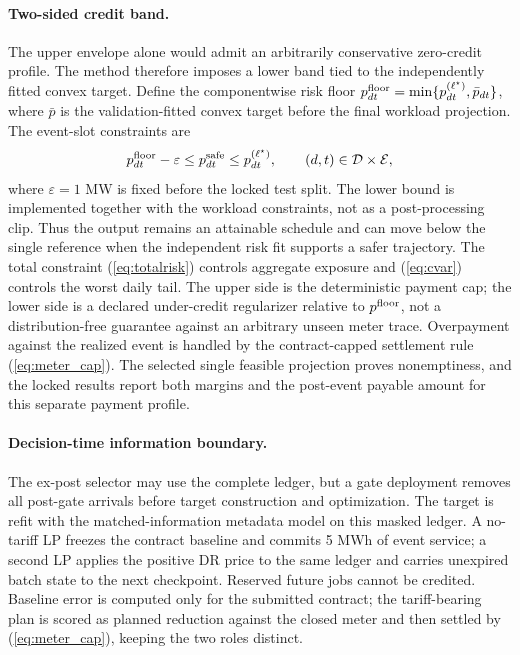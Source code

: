 \documentclass[10pt,journal]{IEEEtran}
\begin{document}
\paragraph{Two-sided credit band.}
The upper envelope alone would admit an arbitrarily conservative zero-credit
profile. The method therefore imposes a lower band tied to the independently fitted
convex target. Define the componentwise risk floor
\(p^{\rm floor}_{dt}=\min\{p^{(\ell^\star)}_{dt},\bar p_{dt}\}\), where \(\bar p\)
is the validation-fitted convex target before the final workload projection.
The event-slot constraints are
\begin{equation}
 p^{\rm floor}_{dt}-\varepsilon
 \leq p^{\rm safe}_{dt}\leq p^{(\ell^\star)}_{dt},
 \qquad (d,t)\in\mathcal D\times\mathcal E,
 \label{eq:twosided}
\end{equation}
where $\varepsilon=1$ MW is fixed before the locked test split. The lower
bound is implemented together with the workload constraints, not as a
post-processing clip. Thus the output remains an attainable schedule and can
move below the single reference when the independent risk fit supports a safer
trajectory. The total constraint (\ref{eq:totalrisk}) controls aggregate
exposure and (\ref{eq:cvar}) controls the worst daily tail. The upper side is
the deterministic payment cap; the lower side is a declared under-credit
regularizer relative to $p^{\rm floor}$, not a distribution-free guarantee
against an arbitrary unseen meter trace. Overpayment against the realized
event is handled by the contract-capped settlement rule (\ref{eq:meter_cap}). The selected
single feasible projection proves nonemptiness, and the locked results report
both margins and the post-event payable amount for this separate payment
profile.

\paragraph{Decision-time information boundary.}
The ex-post selector may use the complete ledger, but a gate deployment removes
all post-gate arrivals before target construction and optimization. The target
is refit with the matched-information metadata model on this masked ledger. A
no-tariff LP freezes the contract baseline and commits 5 MWh of event service;
a second LP applies the positive DR price to the same ledger and carries
unexpired batch state to the next checkpoint. Reserved future jobs cannot be
credited. Baseline error is computed only for the submitted contract; the
tariff-bearing plan is scored as planned reduction against the closed meter and
then settled by (\ref{eq:meter_cap}), keeping the two roles distinct.
\end{document}
